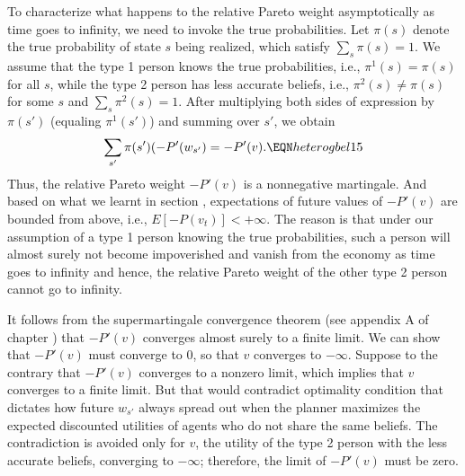 To characterize what happens to the relative
Pareto weight asymptotically as time goes to
infinity, we need to invoke the true probabilities.
Let $\pi(s)$ denote the true probability of 
state $s$ being realized, which satisfy
$\sum_{s} \pi(s) =1$. We assume that 
the type 1 person knows the true probabilities, 
i.e., $\pi^1(s)=\pi(s)$ for all $s$, while
the type 2 person has less accurate beliefs, i.e.,
$\pi^2(s) \neq \pi(s)$ for some $s$ and
$\sum_{s} \pi^2(s) =1$. After multiplying both sides 
of expression  by $\pi(s')$
(equaling $\pi^1(s')$) and summing over $s'$, 
we obtain
$$
\sum_{s'} \pi(s') (-P'(w_{s'}) = -P'(v) .    
                             \EQN heterogbel15 $$
Thus, the relative Pareto weight $-P'(v)$ is 
a nonnegative martingale. And based on what we 
learnt in section ,
expectations of future values of $-P'(v)$ are
bounded from above, i.e., $E[-P(v_t)]<+\infty$.
The reason is that under our assumption of
a type 1 person knowing the true probabilities,
such a person will almost surely not become
impoverished and vanish from the economy as
time goes to infinity and 
hence, the relative Pareto weight of the other 
type 2 person cannot go to infinity.

It follows from the supermartingale convergence
theorem (see appendix A of chapter ) 
that $-P'(v)$ converges almost surely to a finite
limit. We can show that $-P'(v)$ must converge 
to $0$, so that $v$ converges to $-\infty$. 
Suppose to the contrary that $-P'(v)$ converges 
to a nonzero limit, which implies that $v$ 
converges to a finite limit. But that would
contradict optimality condition 
that dictates how future $w_{s'}$ always 
spread out when the planner maximizes the
expected discounted utilities of agents who
do not share the same beliefs. The 
contradiction is avoided only for $v$, the
utility of the type 2 person with the less
accurate beliefs, converging to $-\infty$; 
therefore, the limit of
$-P'(v)$ must be zero.













